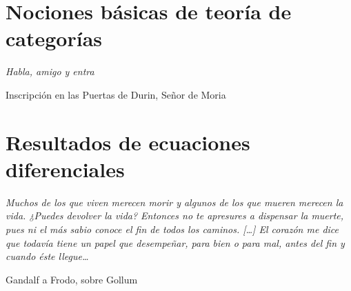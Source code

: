 \documentclass[12pt,a4paper]{book}
\theoremstyle{definition} \newtheorem{defn}[thm]{Definición}
\theoremstyle{definition} \newtheorem{ejemplo}[thm]{Ejemplo}
\theoremstyle{definition} \newtheorem{ejercicio}[thm]{Ejercicio}
\theoremstyle{remark} \newtheorem*{obs}{Observación}
\begin{document}
\chapter{Nociones básicas de teoría de categorías}
\epigraph{\textit{Habla, amigo y entra}}{Inscripción en las Puertas de Durin, Señor de Moria}
\chapter{Resultados de ecuaciones diferenciales}
\epigraph{\textit{Muchos de los que viven merecen morir y algunos de los que mueren merecen la vida. ¿Puedes devolver la vida? Entonces no te apresures a dispensar la muerte, pues ni el más sabio conoce el fin de todos los caminos. [\dots] El corazón me dice que todavía tiene un papel que desempeñar, para bien o para mal, antes del fin y cuando éste llegue\dots}}{Gandalf a Frodo, sobre Gollum}
		      
\end{document}
